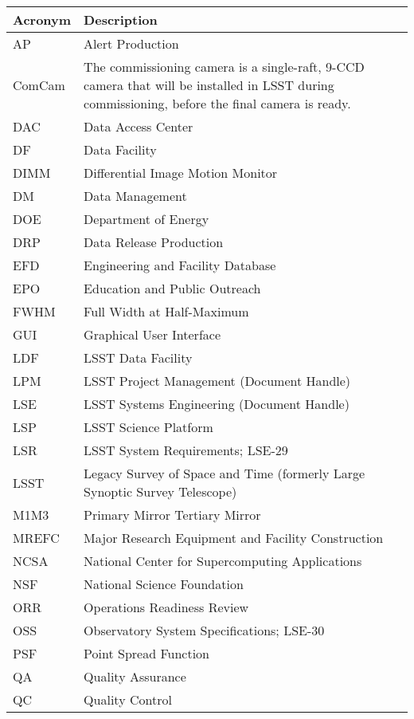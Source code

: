 \addtocounter{table}{-1}
\begin{longtable}{p{}p{}}\hline
\textbf{Acronym} & \textbf{Description}  \\\hline

AP & Alert Production \\\hline
ComCam & The commissioning camera is a single-raft, 9-CCD camera that will be installed in LSST during commissioning, before the final camera is ready. \\\hline
DAC & Data Access Center \\\hline
DF & Data Facility \\\hline
DIMM & Differential Image Motion Monitor \\\hline
DM & Data Management \\\hline
DOE & Department of Energy \\\hline
DRP & Data Release Production \\\hline
EFD & Engineering and Facility Database \\\hline
EPO & Education and Public Outreach \\\hline
FWHM & Full Width at Half-Maximum \\\hline
GUI & Graphical User Interface \\\hline
LDF & LSST Data Facility \\\hline
LPM & LSST Project Management (Document Handle) \\\hline
LSE & LSST Systems Engineering (Document Handle) \\\hline
LSP & LSST Science Platform \\\hline
LSR & LSST System Requirements; LSE-29 \\\hline
LSST & Legacy Survey of Space and Time (formerly Large Synoptic Survey Telescope) \\\hline
M1M3 & Primary Mirror Tertiary Mirror \\\hline
MREFC & Major Research Equipment and Facility Construction \\\hline
NCSA & National Center for Supercomputing Applications \\\hline
NSF & National Science Foundation \\\hline
ORR & Operations Readiness Review \\\hline
OSS & Observatory System Specifications; LSE-30 \\\hline
PSF & Point Spread Function \\\hline
QA & Quality Assurance \\\hline
QC & Quality Control \\\hline

\end{longtable}
